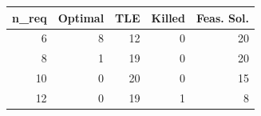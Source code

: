 
\begin{tabular}{rrrrr}
\toprule
n\_req & Optimal & TLE & Killed & Feas. Sol.\\
\midrule
6 & 8 & 12 & 0 & 20\\
8 & 1 & 19 & 0 & 20\\
10 & 0 & 20 & 0 & 15\\
12 & 0 & 19 & 1 & 8\\
\bottomrule
\end{tabular}
